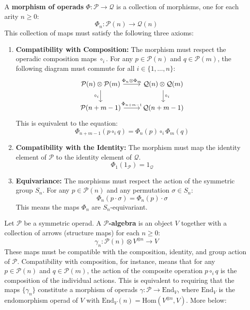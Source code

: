 \documentclass[11pt]{article}
\newcommand{\cat}[1]{\mathcal{#1}}
\newcommand{\Hom}{\mathrm{Hom}}
\newcommand{\End}{\mathrm{End}}
\theoremstyle{definition}
\begin{document}
A \textbf{morphism of operads} $\Phi: \mathcal{P} \to \mathcal{Q}$ is a collection of morphisms, one for each arity $n \ge 0$:
\[
    \Phi_n : \mathcal{P}(n) \to \mathcal{Q}(n)
\]
This collection of maps must satisfy the following three axioms:
\begin{enumerate}
    \item \textbf{Compatibility with Composition:} The morphism must respect the operadic composition maps $\circ_i$. For any $p \in \mathcal{P}(n)$ and $q \in \mathcal{P}(m)$, the following diagram must commute for all $i \in \{1, \dots, n\}$:
    \[
    \begin{tikzcd}
        \mathcal{P}(n) \otimes \mathcal{P}(m) \arrow{r}{\Phi_n \otimes \Phi_m} \arrow{d}[swap]{\circ_i} & \mathcal{Q}(n) \otimes \mathcal{Q}(m) \arrow{d}{\circ_i} \\
        \mathcal{P}(n+m-1) \arrow{r}{\Phi_{n+m-1}} & \mathcal{Q}(n+m-1)
    \end{tikzcd}
    \]
    This is equivalent to the equation:
    \[
        \Phi_{n+m-1}(p \circ_i q) = \Phi_n(p) \circ_i \Phi_m(q)
    \]

    \item \textbf{Compatibility with the Identity:} The morphism must map the identity element of $\mathcal{P}$ to the identity element of $\mathcal{Q}$.
    \[
        \Phi_1(1_{\mathcal{P}}) = 1_{\mathcal{Q}}
    \]

    \item \textbf{Equivariance:} The morphisms must respect the action of the symmetric group $S_n$. For any $p \in \mathcal{P}(n)$ and any permutation $\sigma \in S_n$:
    \[
        \Phi_n(p \cdot \sigma) = \Phi_n(p) \cdot \sigma
    \]
    This means the maps $\Phi_n$ are $S_n$-equivariant.
\end{enumerate}










Let $\cat{P}$ be a symmetric operad. A \textbf{$\cat{P}$-algebra} is an object $V$ together with a collection of arrows  (structure maps) for each $n \ge 0$:
\[
    \gamma_n : \cat{P}(n) \otimes V^{\otimes n} \to V
\]
These maps must be compatible with the composition, identity, and group action of $\cat{P}$. Compatibility with composition, for instance, means that for any $p \in \cat{P}(n)$ and $q \in \cat{P}(m)$, the action of the composite operation $p \circ_i q$ is the composition of the individual actions. This is equivalent to requiring that the maps $\{\gamma_n\}$ constitute a morphism of operads $\gamma: \cat{P} \to \End_V$, where $\End_V$ is the endomorphism operad of $V$ with $\End_V(n) = \Hom(V^{\otimes n}, V)$. More below:
\end{document}
